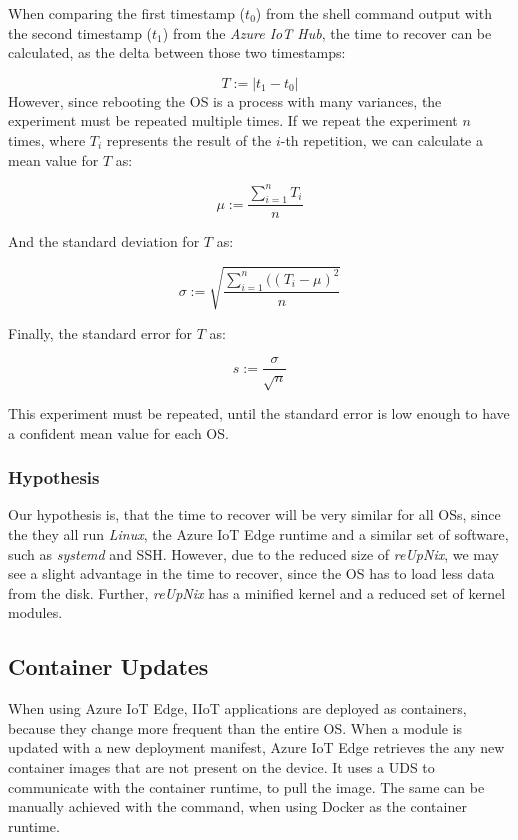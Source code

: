 \noindent
When comparing the first timestamp ($t_0$) from the shell command output with the second
timestamp ($t_1$) from the \textit{Azure IoT Hub}, the time to recover can be calculated,
as the delta between those two timestamps:

\begin{equation}
    T := |t_1 - t_0|
\end{equation}
However, since rebooting the \ac{OS} is a process with many variances, the experiment
must be repeated multiple times. If we repeat the experiment $n$ times, where
$T_i$ represents the result of the $i$-th repetition, we can calculate
a mean value for $T$ as:

\begin{equation}
    \mu := \frac{\sum_{i=1}^{n}T_i}{n}
\end{equation}

\noindent
And the standard deviation for $T$ as:

\begin{equation}
   \sigma := \sqrt{\frac{\sum_{i=1}^{n}((T_i - \mu)^2}{n}}
\end{equation}

\noindent
Finally, the standard error for $T$ as:

\begin{equation}
    s := \frac{\sigma}{\sqrt{n}}
\end{equation}

\noindent
This experiment must be repeated, until the standard error is low enough
to have a confident mean value for each \ac{OS}.

\subsubsection{Hypothesis}
Our hypothesis is, that the time to recover will be very similar for all
\ac{OS}s, since the they all run \textit{Linux}, the Azure IoT Edge runtime and
a similar set of software, such as \textit{systemd} and \ac{SSH}. However, due
to the reduced size of \textit{reUpNix}, we may see a slight advantage in the
time to recover, since the \ac{OS} has to load less data from the disk. Further,
\textit{reUpNix} has a minified kernel and a reduced set of kernel modules.

\clearpage
\subsection{Container Updates}
When using Azure IoT Edge, \ac{IIoT} applications are deployed as containers, because
they change more frequent than the entire \ac{OS}. When a module is updated
with a new deployment manifest, Azure IoT Edge retrieves the any new container
images that are not present on the device. It uses a \ac{UDS} to communicate
with the container runtime, to pull the image. The same can be manually achieved
with the  command, when using Docker as the container runtime.

